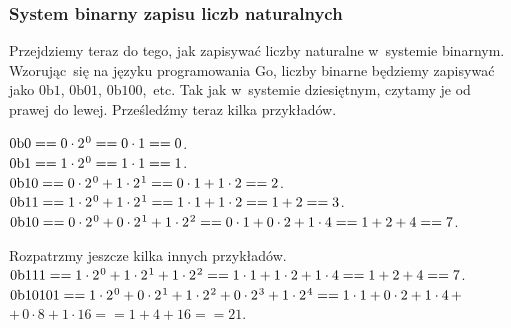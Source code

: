\documentclass[10pt,t]{beamer}
\newcommand{\btext}{\text{b}}
\begin{document}
\begin{frame}
  \frametitle{System binarny zapisu liczb naturalnych}


  Przejdziemy teraz do tego, jak zapisywać liczby naturalne w~systemie
  binarnym. Wzorując~się na języku programowania Go, liczby binarne
  będziemy zapisywać jako $0\text{b}1$, $0\text{b}01$, $0\text{b}100$,~etc.
  Tak jak w~systemie dziesiętnym, czytamy je od prawej do lewej.
  Prześledźmy teraz kilka przykładów.

  $0\btext 0 == 0 \cdot 2^{ \HorSpaceTwo 0 } == 0 \cdot 1 == 0$. \\
  $0\btext 1 == 1 \cdot 2^{ \HorSpaceTwo 0 } == 1 \cdot 1 == 1$. \\
  $0\btext 10 == 0 \cdot 2^{ \HorSpaceTwo 0 } + 1 \cdot 2^{ \HorSpaceTwo 1 } ==
  0 \cdot 1 + 1 \cdot 2 == 2$. \\
  $0\btext 11 == 1 \cdot 2^{ \HorSpaceTwo 0 } + 1 \cdot 2^{ \HorSpaceTwo 1 } ==
  1 \cdot 1 + 1 \cdot 2 == 1 + 2 == 3$. \\
  $0\btext 10 == 0 \cdot 2^{ \HorSpaceTwo 0 } + 0 \cdot 2^{ \HorSpaceTwo 1 } +
  1 \cdot 2^{ \HorSpaceTwo 2 } == 0 \cdot 1 + 0 \cdot 2 + 1 \cdot 4 == 1 + 2 + 4 == 7$.

  Rozpatrzmy jeszcze kilka innych przykładów. \\
  $0\btext 111 == 1 \cdot 2^{ \HorSpaceTwo 0 } + 1 \cdot 2^{ \HorSpaceTwo 1 } +
  1 \cdot 2^{ \HorSpaceTwo 2 } == 1 \cdot 1 + 1 \cdot 2 + 1 \cdot 4 == 1 + 2 + 4 == 7$. \\
  $0\btext 10101 == 1 \cdot 2^{ \HorSpaceTwo 0 } + 0 \cdot 2^{ \HorSpaceTwo 1 } +
  1 \cdot 2^{ \HorSpaceTwo 2 } + 0 \cdot 2^{ \HorSpaceTwo 3 } + 1 \cdot 2^{ \HorSpaceTwo 4 } ==
  1 \cdot 1 + 0 \cdot 2 + 1 \cdot 4 \, +$ \\
  $+ \, 0 \cdot 8 + 1 \cdot 16 == 1 + 4 + 16 == 21$.

\end{frame}
\end{document}
